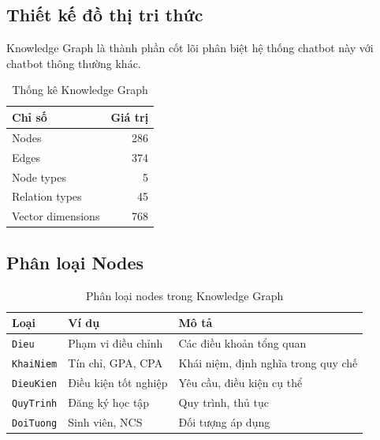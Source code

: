 \documentclass[12pt,a4paper]{article}
\begin{document}
\subsection{Thiết kế đồ thị tri thức}
Knowledge Graph là thành phần cốt lõi phân biệt hệ thống chatbot này với chatbot thông thường khác.
\begin{table}[H]
\centering
\caption{Thống kê Knowledge Graph}
\begin{tabular}{lr}
\toprule
\textbf{Chỉ số} & \textbf{Giá trị} \\
\midrule
Nodes & 286 \\
Edges & 374 \\
Node types  & 5 \\
Relation types  & 45 \\
Vector dimensions & 768 \\
\bottomrule
\end{tabular}
\end{table}

\subsection{Phân loại Nodes}
\begin{table}[H]
\centering
\caption{Phân loại nodes trong Knowledge Graph}
\begin{tabularx}{\textwidth}{llX}
\toprule
\textbf{Loại} & \textbf{Ví dụ} & \textbf{Mô tả} \\
\midrule
\texttt{Dieu} & Phạm vi điều chỉnh & Các điều khoản tổng quan \\
\texttt{KhaiNiem} & Tín chỉ, GPA, CPA & Khái niệm, định nghĩa trong quy chế \\
\texttt{DieuKien} & Điều kiện tốt nghiệp & Yêu cầu, điều kiện cụ thể \\
\texttt{QuyTrinh} & Đăng ký học tập & Quy trình, thủ tục\\
\texttt{DoiTuong} & Sinh viên, NCS & Đối tượng áp dụng \\
\bottomrule
\end{tabularx}
\end{table}
\end{document}
